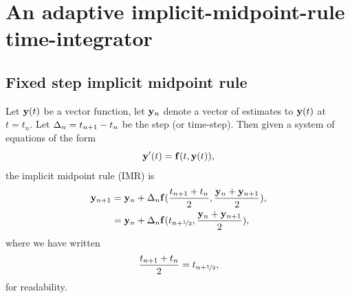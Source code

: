 


\newcommand{\thfx}[1]{t_{#1+\half}}
\newcommand{\thf}{\thfx{n}}

\newcommand{\yvhfx}[2]{\yv#1(\thfx{#2})}
\newcommand{\yvhf}[1][]{\yvhfx{#1}{n}}

\newcommand{\dfdy}{F}
\newcommand{\dfdyhfx}[1]{\dfdy_{#1+\half}}
\newcommand{\dfdyhf}{\dfdyhfx{n}}

\newcommand{\ymiderr}{a_n}




\section{An adaptive implicit-midpoint-rule time-integrator}





\subsection{Fixed step implicit midpoint rule}

Let $\mathbf{y}(t)$ be a vector function, let $\mathbf{y}_n$ denote a vector of estimates to $\mathbf{y}(t)$ at $t = t_n$.
Let $\Delta_{n} = t_{n+1} - t_n$ be the step (or time-step).
Then given a system of equations of the form
\begin{equation}
  \mathbf{y}'(t) = {\mathbf{f}}(t, \mathbf{y}(t)),
  \label{eq:43}
\end{equation}
the implicit midpoint rule (IMR) is
\begin{align}
  \yv_{n+1} &= \yv_n + \dtn \fv(\frac{t_{n+1} + t_n}{2}, \frac{\yv_n + \yv_{n+1}}{2}), \notag\\
  &= \yv_n + \dtn \fv(\thf, \frac{\yv_n + \yv_{n+1}}{2}),
  \label{eq:basic-midpoint}
\end{align}
where we have written
\begin{equation}
  \frac{t_{n+1} + t_n}{2} = \thf,
\end{equation}
for readability.

